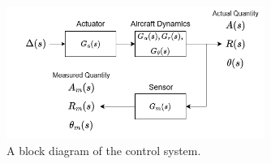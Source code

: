 \documentclass[10pt,a4paper]{article}
\begin{document}
    \begin{figure}[h]
        \centering
        \includegraphics[width = 0.75\textwidth]{figs/ELE2038_H5.drawio.png}
        \caption{A block diagram of the control system.}
        \label{fig:blockDiagram}
    \end{figure}
    
\end{document}

